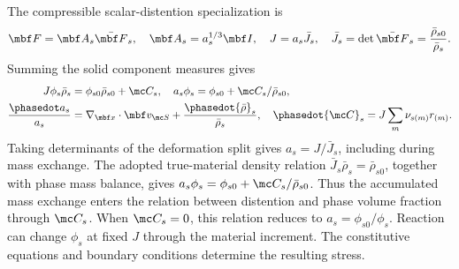 \documentclass[11pt]{article}
\begin{document}
The compressible scalar-distention specialization is
\begin{equation}
 \mbf F=\mbf A_s\bar{\mbf F}_s,
 \quad \mbf A_s=a_s^{1/3}\mbf I,
 \quad J=a_s\bar J_s,
 \quad \bar J_s=\det\bar{\mbf F}_s=\frac{\bar\rho_{s0}}{\bar\rho_s}.
 \label{eq:distention}
\end{equation}
Summing the solid component measures gives
\begin{align}
 J\phi_s\bar\rho_s&=\phi_{s0}\bar\rho_{s0}+\mc C_s,
 \quad a_s\phi_s=\phi_{s0}+\mc C_s/\bar\rho_{s0},\label{eq:solid_material_mass}\\
 \frac{\phasedot a_s}{a_s}&=\nabla_{\mbf x}\cdot\mbf v_{\mc S}
 +\frac{\phasedot{\bar\rho}_s}{\bar\rho_s},
 \quad \phasedot{\mc C}_s=J\sum_m\nu_{s(m)}r_{(m)}.\label{eq:distention_rate}
\end{align}
Taking determinants of the deformation split gives \(a_s=J/\bar J_s\), including during mass exchange. The adopted true-material density relation \(\bar J_s\bar\rho_s=\bar\rho_{s0}\), together with phase mass balance, gives \(a_s\phi_s=\phi_{s0}+\mc C_s/\bar\rho_{s0}\). Thus the accumulated mass exchange enters the relation between distention and phase volume fraction through \(\mc C_s\). When \(\mc C_s=0\), this relation reduces to \(a_s=\phi_{s0}/\phi_s\). Reaction can change \(\phi_s\) at fixed \(J\) through the material increment. The constitutive equations and boundary conditions determine the resulting stress.
\end{document}
